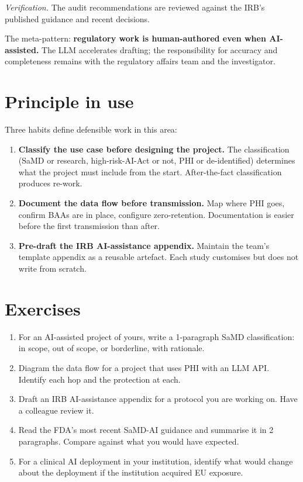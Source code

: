 \documentclass[
  letterpaper,
  11pt]{scrbook}
\begin{document}
\emph{Verification.} The audit recommendations are reviewed against the
IRB's published guidance and recent decisions.

The meta-pattern: \textbf{regulatory work is human-authored even when
AI-assisted.} The LLM accelerates drafting; the responsibility for
accuracy and completeness remains with the regulatory affairs team and
the investigator.

\section{Principle in use}\label{principle-in-use-11}

Three habits define defensible work in this area:

\begin{enumerate}
\def\labelenumi{\arabic{enumi}.}
\item
  \textbf{Classify the use case before designing the project.} The
  classification (SaMD or research, high-risk-AI-Act or not, PHI or
  de-identified) determines what the project must include from the
  start. After-the-fact classification produces re-work.
\item
  \textbf{Document the data flow before transmission.} Map where PHI
  goes, confirm BAAs are in place, configure zero-retention.
  Documentation is easier before the first transmission than after.
\item
  \textbf{Pre-draft the IRB AI-assistance appendix.} Maintain the team's
  template appendix as a reusable artefact. Each study customises but
  does not write from scratch.
\end{enumerate}

\section{Exercises}\label{exercises-11}

\begin{enumerate}
\def\labelenumi{\arabic{enumi}.}
\item
  For an AI-assisted project of yours, write a 1-paragraph SaMD
  classification: in scope, out of scope, or borderline, with rationale.
\item
  Diagram the data flow for a project that uses PHI with an LLM API.
  Identify each hop and the protection at each.
\item
  Draft an IRB AI-assistance appendix for a protocol you are working on.
  Have a colleague review it.
\item
  Read the FDA's most recent SaMD-AI guidance and summarise it in 2
  paragraphs. Compare against what you would have expected.
\item
  For a clinical AI deployment in your institution, identify what would
  change about the deployment if the institution acquired EU exposure.
\end{enumerate}
\end{document}
